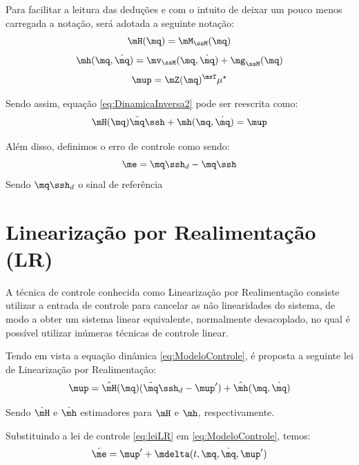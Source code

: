 \documentclass[]{politex}
\begin{document}
Para facilitar a leitura das deduções e com o intuito de deixar um pouco menos carregada a notação, será adotada a seguinte notação:
\begin{equation}
\mH(\mq) = \mM_{\ssM}(\mq)
\end{equation}
\begin{equation}
\mh(\mq, \dot{\mq}) = \mv_{\ssM}(\mq, \dot{\mq}) + \mg_{\ssM}(\mq)
\end{equation}
\begin{equation}
\mup = \mZ(\mq)^{\msT} \mu^\star
\end{equation}

Sendo assim, equação \eqref{eq:DinamicaInversa2} pode ser reescrita como:
\begin{equation} \label{eq:ModeloControle}
\mH(\mq)  \ddot{\mq}\ssh + \mh(\mq,\dot{\mq}) = \mup
\end{equation}

Além disso, definimos o erro de controle como sendo:
\begin{equation}
\me = \mq\ssh_d - \mq\ssh
\end{equation}
Sendo $\mq\ssh_d$ o sinal de referência

\section{Linearização por Realimentação (LR)}\label{S05-05-00}

A técnica de controle conhecida como Linearização por Realimentação consiste utilizar a entrada de controle para cancelar as não linearidades do sistema, de modo a obter um sistema linear equivalente, normalmente desacoplado, no qual é possível utilizar inúmeras técnicas de controle linear.

Tendo em vista a equação dinâmica \eqref{eq:ModeloControle}, é proposta a seguinte lei de Linearização por Realimentação:
\begin{equation} \label{eq:leiLR}
\mup = \hat{\mH}(\mq) (\ddot{\mq}\ssh_d - \mup' ) + \hat{\mh}(\mq,\dot{\mq})
\end{equation}

Sendo $\hat{\mH}$ e $\hat{\mh}$ estimadores para $\mH$ e $\mh$, respectivamente.

Substituindo a lei de controle \eqref{eq:leiLR} em \eqref{eq:ModeloControle}, temos:
\begin{equation} \label{eq:ModeloLin}
\ddot{\me}  = \mup' + \mdelta(t,\mq,\dot{\mq}, \mup')
\end{equation}
\end{document}

